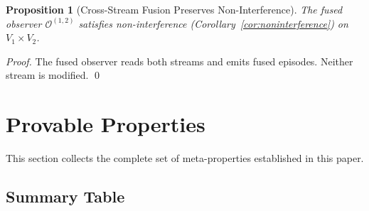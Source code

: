 \documentclass[11pt,a4paper]{article}
\theoremstyle{plain}
\newtheorem{proposition}[theorem]{Proposition}
\theoremstyle{definition}
\theoremstyle{remark}
\newcommand{\Obs}{\mathcal{O}}
\begin{document}
\begin{proposition}[Cross-Stream Fusion Preserves Non-Interference]
  The fused observer $\Obs^{(1,2)}$ satisfies non-interference (Corollary~\ref{cor:noninterference})
  on $V_1 \times V_2$.
\end{proposition}
\begin{proof}
  The fused observer reads both streams and emits fused episodes. Neither stream is modified. \qed
\end{proof}

\section{Provable Properties}
\label{sec:properties}

This section collects the complete set of meta-properties established in this paper.

\subsection{Summary Table}
\end{document}
